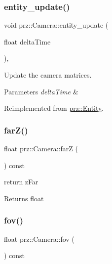 \subsubsection{\texorpdfstring{entity\_update()}{entity\_update()}}
{\footnotesize\ttfamily void prz\+::\+Camera\+::entity\+\_\+update (\begin{DoxyParamCaption}\item[{float}]{delta\+Time }\end{DoxyParamCaption})\hspace{0.3cm}{\ttfamily [override]}, {\ttfamily [virtual]}}



Update the camera matrices. 


\begin{DoxyParams}{Parameters}
{\em delta\+Time} & \\
\hline
\end{DoxyParams}


Reimplemented from \mbox{\hyperlink{classprz_1_1_entity_abf4cb73b801b239f61535eec0505b26d}{prz\+::\+Entity}}.

\mbox{\label{classprz_1_1_camera_a6498a63b05939b136657b99d8a8fc9ce}} 
\subsubsection{\texorpdfstring{farZ()}{farZ()}}
{\footnotesize\ttfamily float prz\+::\+Camera\+::farZ (\begin{DoxyParamCaption}{ }\end{DoxyParamCaption}) const\hspace{0.3cm}{\ttfamily [inline]}}



return z\+Far 

\begin{DoxyReturn}{Returns}
float 
\end{DoxyReturn}
\mbox{\label{classprz_1_1_camera_a1424858488672135d41e1376c7c0db11}} 
\subsubsection{\texorpdfstring{fov()}{fov()}}
{\footnotesize\ttfamily float prz\+::\+Camera\+::fov (\begin{DoxyParamCaption}{ }\end{DoxyParamCaption}) const\hspace{0.3cm}{\ttfamily [inline]}}



